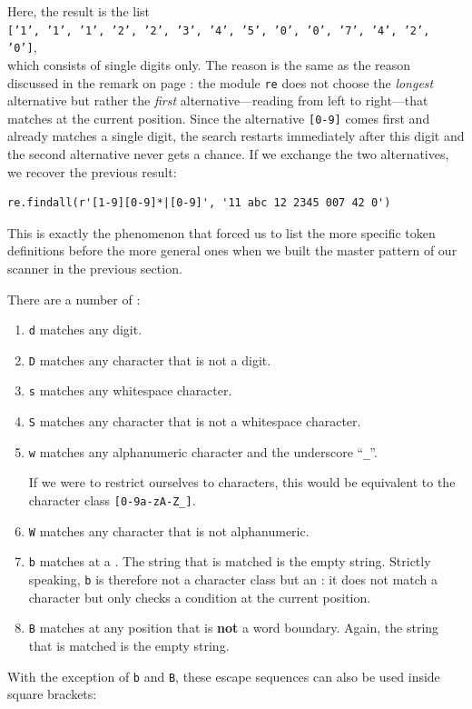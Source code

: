 \noindent
Here, the result is the list
\\[0.2cm]
\hspace*{0.1cm}
\texttt{['1', '1', '1', '2', '2', '3', '4', '5', '0', '0', '7', '4', '2', '0']},
\\[0.2cm]
which consists of single digits only.  The reason is the same as the reason discussed in the remark on page
\pageref{fig:regexp-scanner.py-1}: the module \texttt{re} does not choose the \emph{longest} alternative but
rather the \emph{first} alternative---reading from left to right---that matches at the current position.  Since
the alternative \texttt{[0-9]} comes first and already matches a single digit, the search restarts immediately
after this digit and the second alternative never gets a chance.  If we exchange the two alternatives, we
recover the previous result:

\begin{verbatim}
re.findall(r'[1-9][0-9]*|[0-9]', '11 abc 12 2345 007 42 0')
\end{verbatim}

\noindent
This is exactly the phenomenon that forced us to list the more specific token definitions before the more
general ones when we built the master pattern of our scanner in the previous section.

There are a number of :
\begin{enumerate}
\item \texttt{d} matches any digit.
\item \texttt{D} matches any character that is not a digit.
\item \texttt{s} matches any whitespace character.
\item \texttt{S} matches any character that is not a whitespace character.
\item \texttt{w} matches any alphanumeric character and the underscore ``\texttt{\_}''.

      If we were to restrict ourselves to  characters, this would be equivalent to the
      character class \texttt{[0-9a-zA-Z\_]}.
\item \texttt{W} matches any character that is not alphanumeric.
\item \texttt{b} matches at a .  The string that is matched
      is the empty string.  Strictly speaking, \texttt{b} is therefore not a character class but an
      : it does not match a character but only checks a condition at the
      current position.
\item \texttt{B} matches at any position that is \textbf{not} a word boundary.  Again, the string
      that is matched is the empty string.
\end{enumerate}
With the exception of \texttt{b} and \texttt{B}, these escape sequences can also be used
inside square brackets:

